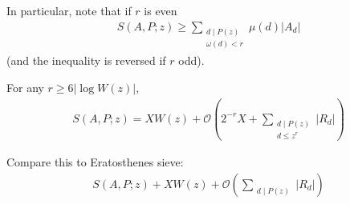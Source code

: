\documentclass{article}
\newcommand{\bigO}{\mathcal{O}}
\begin{document}
In particular, note that if $r$ is even
\begin{align*}
  S(A,P;z) \geq \sum_{\substack{d \mid P(z) \\ \omega(d) < r}} \mu(d) |A_d|
\end{align*}
(and the inequality is reversed if $r$ odd).

\begin{thm}
  \newlec
  For any $r \geq 6 |\log W(z)|$,
  \begin{align*}
    S(A,P;z) = XW(z) + \bigO\left(2^{-r} X + \sum_{\substack{d \mid P(z) \\ d \leq z^r}} |R_d|\right)
  \end{align*}
\end{thm}
Compare this to Eratosthenes sieve:
\begin{align*}
  S(A,P;z) + X W(z) + \bigO\left(\sum_{\substack{d \mid P(z)}} |R_d|\right)
\end{align*}
\end{document}
